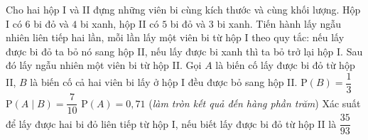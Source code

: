 \begin{ex}%
	Cho hai hộp I và II đựng những viên bi cùng kích thước và cùng khối lượng. Hộp I có $6$ bi đỏ và $4$ bi xanh, hộp II có $5$ bi đỏ và $3$ bi xanh. Tiến hành lấy ngẫu nhiên liên tiếp hai lần, mỗi lần lấy một viên bi từ hộp I theo quy tắc: nếu lấy được bi đỏ ta bỏ nó sang hộp II, nếu lấy được bi xanh thì ta bỏ trở lại hộp I. Sau đó lấy ngẫu nhiên một viên bi từ hộp II. Gọi $A$ là biến cố lấy được bi đỏ từ hộp II, $B$ là biến cố cả hai viên bi lấy ở hộp I đều được bỏ sang hộp II.
	\choiceTF
	{\True $\mathrm{P}(B) = \dfrac{1}{3}$}
	{\True $\mathrm{P}\left(A\mid B\right) = \dfrac{7}{10}$}
	{$\mathrm{P}(A) = 0{,}71$ (\textit{làm tròn kết quả đến hàng phần trăm})}
	{Xác suất để lấy được hai bi đỏ liên tiếp từ hộp I, nếu biết lấy được bi đỏ từ hộp II là $\dfrac{35}{93}$}
\end{ex}

